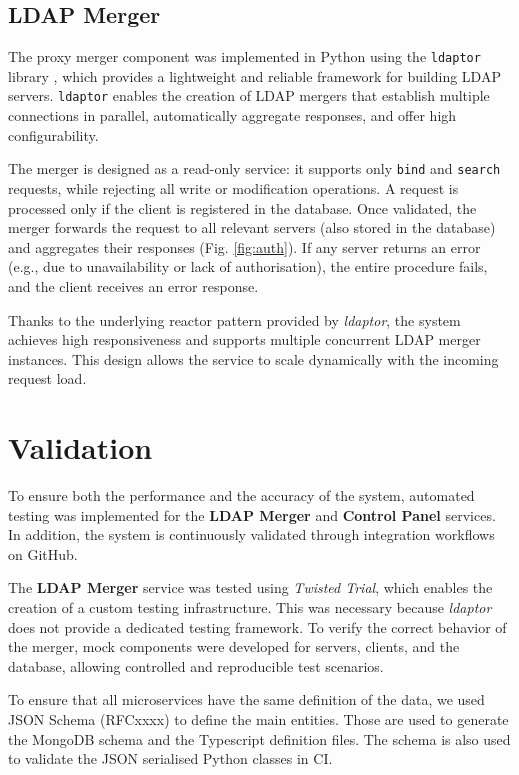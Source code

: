 \documentclass{scrartcl}
\begin{document}
\subsection{LDAP Merger}

\par The proxy merger component was implemented in Python using the \texttt{ldaptor} library \cite{ldaptor}, which provides a lightweight and reliable framework for building LDAP servers. \texttt{ldaptor} enables the creation of LDAP mergers that establish multiple connections in parallel, automatically aggregate responses, and offer high configurability.
\par The merger is designed as a read-only service: it supports only \texttt{bind} and \texttt{search} requests, while rejecting all write or modification operations. A request is processed only if the client is registered in the database. Once validated, the merger forwards the request to all relevant servers (also stored in the database) and aggregates their responses (Fig. \ref{fig:auth}). If any server returns an error (e.g., due to unavailability or lack of authorisation), the entire procedure fails, and the client receives an error response.
\par Thanks to the underlying reactor pattern provided by \textit{ldaptor}, the system achieves high responsiveness and supports multiple concurrent LDAP merger instances. This design allows the service to scale dynamically with the incoming request load.

\section{Validation}

\par To ensure both the performance and the accuracy of the system, automated testing was implemented for the \textbf{LDAP Merger} and \textbf{Control Panel} services. In addition, the system is continuously validated through integration workflows on GitHub.
\par The \textbf{LDAP Merger} service was tested using \textit{Twisted Trial}, which enables the creation of a custom testing infrastructure. This was necessary because \textit{ldaptor} does not provide a dedicated testing framework. To verify the correct behavior of the merger, mock components were developed for servers, clients, and the database, allowing controlled and reproducible test scenarios.
\par To ensure that all microservices have the same definition of the data,
we used JSON Schema (RFCxxxx) to define the main entities. Those are used to generate the MongoDB schema and the Typescript
definition files. The schema is also used to validate the JSON serialised Python classes in CI.
\end{document}
